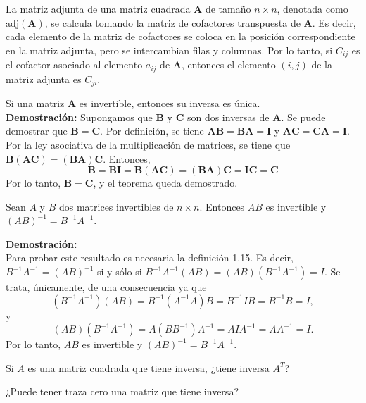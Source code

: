 La matriz adjunta de una matriz cuadrada $\boldsymbol{A}$ de tamaño $n \times n$, denotada como $\text{{adj}}(\boldsymbol{A})$, se calcula tomando la matriz de cofactores transpuesta de $\boldsymbol{A}$. Es decir, cada elemento de la matriz de cofactores se coloca en la posición correspondiente en la matriz adjunta, pero se intercambian filas y columnas. Por lo tanto, si $C_{ij}$ es el cofactor asociado al elemento $a_{ij}$ de $\boldsymbol{A}$, entonces el elemento $(i, j)$ de la matriz adjunta es $C_{ji}$.
\begin{tcolorbox}[colback=white!5!white,colframe=red!50!red,title=Teorema]
Si una matriz $\boldsymbol{A}$ es invertible, entonces su inversa es única.\\
\textbf{Demostración:} Supongamos que $\boldsymbol{B}$ y $\boldsymbol{C}$ son dos inversas de $\boldsymbol{A}$. Se puede demostrar que $\boldsymbol{B} = \boldsymbol{C}$. Por definición, se tiene $\boldsymbol{AB} = \boldsymbol{BA} = \boldsymbol{I}$ y $\boldsymbol{AC} =\boldsymbol{ CA} = \boldsymbol{I}$. Por la ley asociativa de la multiplicación de matrices, se tiene que $\boldsymbol{B}(\boldsymbol{AC}) = (\boldsymbol{BA})\boldsymbol{C}$. Entonces,
\[ \boldsymbol{B} = \boldsymbol{BI} = \boldsymbol{B(AC)} = \boldsymbol{(BA)C} = \boldsymbol{IC} = \boldsymbol{C} \]
Por lo tanto, $\boldsymbol{B} = \boldsymbol{C}$, y el teorema queda demostrado. 
\end{tcolorbox}
\begin{tcolorbox}[colback=white!5!white,colframe=red!50!red,title=Teorema]
Sean $A$ y $B$ dos matrices invertibles de $n \times n$. Entonces $AB$ es invertible y 
$(AB)^{-1} = B^{-1} A^{-1}$.

\textbf{Demostración:}\\
Para probar este resultado es necesaria la definición 1.15. Es decir, $B^{-1} A^{-1} = (AB)^{-1}$ si 
y sólo si $B^{-1} A^{-1} (AB) = (AB) (B^{-1} A^{-1}) = I$. Se trata, únicamente, de una consecuencia 
ya que
\[
(B^{-1} A^{-1})(AB) = B^{-1}(A^{-1}A)B = B^{-1}IB = B^{-1}B = I,
\]
y
\[
(AB)(B^{-1} A^{-1}) = A(BB^{-1})A^{-1} = AIA^{-1} = AA^{-1} = I.
\]
Por lo tanto, $AB$ es invertible y $(AB)^{-1} = B^{-1} A^{-1}$.
 \end{tcolorbox}
\begin{exercise}
Si $A$ es una matriz cuadrada que tiene inversa,  ¿tiene inversa $A^T$?  
\end{exercise}
\begin{exercise}
¿Puede tener traza cero una matriz que tiene inversa?
\end{exercise}
